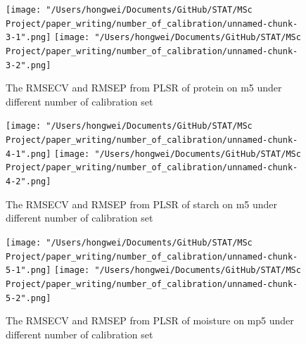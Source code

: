 \documentclass[a4paper,12pt,titlepage]{article} %
\numberwithin{equation}{section}  %
\begin{document}
\begin{appendices}
			\begin{figure}[h]    %
	\centering           %
	\texttt{[image: "/Users/hongwei/Documents/GitHub/STAT/MSc Project/paper\_writing/number\_of\_calibration/unnamed-chunk-3-1".png]}  %
	\texttt{[image: "/Users/hongwei/Documents/GitHub/STAT/MSc Project/paper\_writing/number\_of\_calibration/unnamed-chunk-3-2".png]}  %
	\caption{The RMSECV and RMSEP from PLSR of protein on m5 under different number of calibration set}          %
	\label{fig:calibration_3-1}               %
\end{figure}                        %



			\begin{figure}[h]    %
	\centering           %
	\texttt{[image: "/Users/hongwei/Documents/GitHub/STAT/MSc Project/paper\_writing/number\_of\_calibration/unnamed-chunk-4-1".png]}  %
	\texttt{[image: "/Users/hongwei/Documents/GitHub/STAT/MSc Project/paper\_writing/number\_of\_calibration/unnamed-chunk-4-2".png]}  %
	\caption{The RMSECV and RMSEP from PLSR of starch on m5 under different number of calibration set}          %
	\label{fig:calibration_4-1}               %
\end{figure}                        %



			\begin{figure}[h]    %
	\centering           %
	\texttt{[image: "/Users/hongwei/Documents/GitHub/STAT/MSc Project/paper\_writing/number\_of\_calibration/unnamed-chunk-5-1".png]}  %
	\texttt{[image: "/Users/hongwei/Documents/GitHub/STAT/MSc Project/paper\_writing/number\_of\_calibration/unnamed-chunk-5-2".png]}  %
	\caption{The RMSECV and RMSEP from PLSR of moisture on mp5 under different number of calibration set}          %
	\label{fig:calibration_5-1}               %
\end{figure}                        %




\end{appendices}
\end{document}
